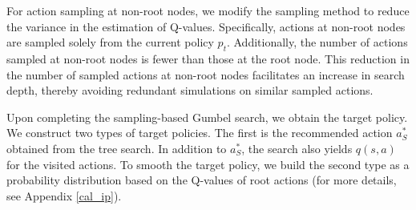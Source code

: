 
For action sampling at non-root nodes, we modify the sampling method to reduce the variance in the estimation of Q-values. Specifically, actions at non-root nodes are sampled solely from the current policy \( p_t \). Additionally, the number of actions sampled at non-root nodes is fewer than those at the root node. This reduction in the number of sampled actions at non-root nodes facilitates an increase in search depth, thereby avoiding redundant simulations on similar sampled actions.

Upon completing the sampling-based Gumbel search, we obtain the target policy. We construct two types of target policies. The first is the recommended action \( a^*_S \) obtained from the tree search. In addition to \( a^*_S \), the search also yields \( q(s,a) \) for the visited actions. To smooth the target policy, we build the second type as a probability distribution based on the Q-values of root actions (for more details, see Appendix \ref{cal_ip}).



